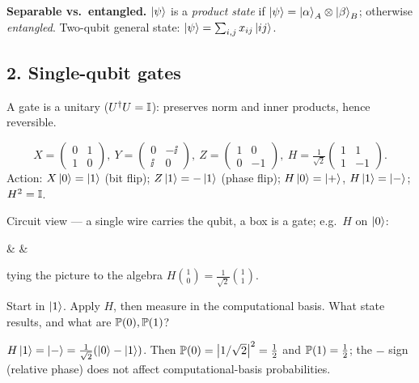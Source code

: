 \documentclass[11pt]{article}
\begin{document}
\begin{board}
\textbf{Separable vs.\ entangled.} $\ket\psi$ is a \emph{product state} if
$\ket\psi=\ket\alpha_A\otimes\ket\beta_B$; otherwise \emph{entangled}.
Two-qubit general state: $\ket\psi=\sum_{i,j}x_{ij}\ket{ij}$.
\end{board}

\subsection*{2. Single-qubit gates }
A gate is a unitary ($U^{\dagger} U=\mathbb{I}$): preserves norm and inner products, hence reversible.

\begin{board}
\[
  X=\begin{pmatrix}0&1\\1&0\end{pmatrix},\
  Y=\begin{pmatrix}0&-\ii\\\ii&0\end{pmatrix},\
  Z=\begin{pmatrix}1&0\\0&-1\end{pmatrix},\
  H=\tfrac1{\sqrt2}\begin{pmatrix}1&1\\1&-1\end{pmatrix}.
\]
Action: $X\ket0=\ket1$ (bit flip); $Z\ket1=-\ket1$ (phase flip);
$H\ket0=\ket{+}$, $H\ket1=\ket{-}$; $H^2=\mathbb{I}$.
\end{board}

\noindent Circuit view --- a single wire carries the qubit, a box is a gate; e.g.\ $H$ on $\ket0$:
\begin{center}
\begin{quantikz}
\lstick{$\ket0$} & \gate{H} & \rstick{$\ket{+}$}\qw
\end{quantikz}
\end{center}
tying the picture to the algebra $H\binom{1}{0}=\tfrac1{\sqrt2}\binom{1}{1}$.

\begin{inclass}\label{ic:Hmeas}
Start in $\ket1$. Apply $H$, then measure in the computational basis. What state
results, and what are $\mathbb{P}(0),\mathbb{P}(1)$?
\end{inclass}
\begin{answer}
$H\ket1=\ket{-}=\tfrac1{\sqrt2}(\ket0-\ket1)$. Then $\mathbb{P}(0)=\left\lvert 1/\sqrt2 \right\rvert^2=\tfrac12$
and $\mathbb{P}(1)=\tfrac12$; the $-$ sign (relative phase) does not affect
computational-basis probabilities.
\end{answer}
\end{document}
